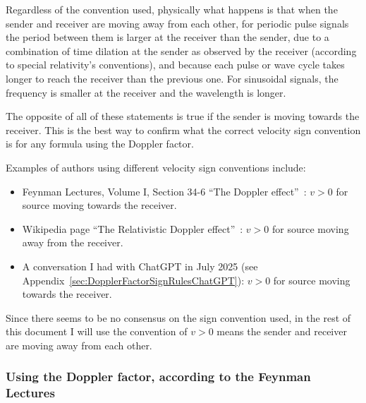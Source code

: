 \documentclass[a4paper]{article}
\theoremstyle{plain}
\theoremstyle{definition}
\begin{document}
Regardless of the convention used, physically what happens is that
when the sender and receiver are moving away from each other, for
periodic pulse signals the period between them is larger at the
receiver than the sender, due to a combination of time dilation at the
sender as observed by the receiver (according to special relativity's
conventions), and because each pulse or wave cycle takes longer to
reach the receiver than the previous one.  For sinusoidal signals, the
frequency is smaller at the receiver and the wavelength is longer.

The opposite of all of these statements is true if the sender is
moving towards the receiver.  This is the best way to confirm what the
correct velocity sign convention is for any formula using the Doppler
factor.

Examples of authors using different velocity sign conventions include:
\begin{itemize}
\item Feynman Lectures, Volume I, Section 34-6 ``The Doppler
  effect''~\cite{FeynmanLecturesVolICh34Sec6}: $v > 0$ for source
  moving towards the receiver.
\item Wikipedia page ``The Relativistic Doppler
  effect''~\cite{WikipediaRelativisticDopplerEffect}: $v > 0$ for
  source moving away from the receiver.
\item A conversation I had with ChatGPT in July 2025 (see
  Appendix~\ref{sec:DopplerFactorSignRulesChatGPT}): $v > 0$ for
  source moving towards the receiver.
\end{itemize}

Since there seems to be no consensus on the sign convention used, in
the rest of this document I will use the convention of $v > 0$ means
the sender and receiver are moving away from each other.


\subsubsection{Using the Doppler factor, according to the Feynman Lectures}
\label{sec:DopplerFactorSignRulesFeynmanLectures}
\end{document}
